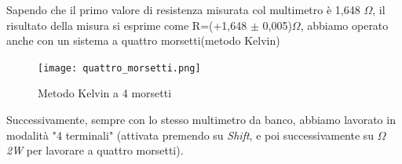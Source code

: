 \begin{table}[!ht]
    \caption{Multimetro 34401A (6$\sfrac{1}{2}$ cifre), 2 Morsetti}
    \label{tab:mult_2w}
\end{table}
\FloatBarrier

 Sapendo che il primo valore di resistenza misurata col multimetro è 1,648 $\Omega$, il risultato della misura si esprime come R=(+1,648 $\pm$ 0,005)$\Omega$, abbiamo operato anche con un sistema a quattro morsetti(metodo Kelvin)


\begin{figure}[h]
    \centering
    \texttt{[image: quattro\_morsetti.png]}
    \caption{Metodo Kelvin a 4 morsetti}
    \label{fig:quattro morsetti}
\end{figure}





Successivamente, sempre con lo stesso multimetro da banco, abbiamo lavorato in modalità "4 terminali" (attivata premendo su \emph{Shift}, e poi successivamente su \emph{$\Omega$2W} per lavorare a quattro morsetti).

